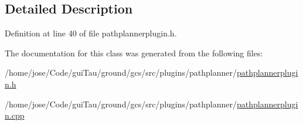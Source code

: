 \subsection{Detailed Description}


Definition at line 40 of file pathplannerplugin.\-h.



The documentation for this class was generated from the following files\-:\begin{DoxyCompactItemize}
\item 
/home/jose/\-Code/gui\-Tau/ground/gcs/src/plugins/pathplanner/\hyperlink{pathplannerplugin_8h}{pathplannerplugin.\-h}\item 
/home/jose/\-Code/gui\-Tau/ground/gcs/src/plugins/pathplanner/\hyperlink{pathplannerplugin_8cpp}{pathplannerplugin.\-cpp}\end{DoxyCompactItemize}
